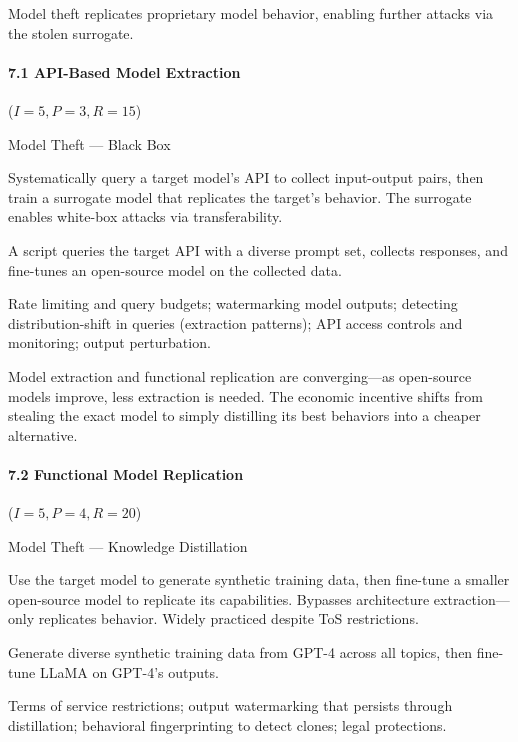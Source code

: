\documentclass[conference]{IEEEtran}
\newenvironment{attackentry}{\begin{description}[style=unboxed,leftmargin=0cm,itemsep=1pt,parsep=1pt,topsep=2pt,font=\sffamily\small\color{accentdark}]}{\end{description}}
\begin{document}
Model theft replicates proprietary model behavior, enabling further attacks via the stolen surrogate.

\paragraph{7.1 API-Based Model Extraction} ($I{=}5, P{=}3, R{=}15$)
\begin{attackentry}
\item[Category:] Model Theft --- Black Box
\item[How it works:] Systematically query a target model's API to collect input-output pairs, then train a surrogate model that replicates the target's behavior. The surrogate enables white-box attacks via transferability.
\item[Example:] A script queries the target API with a diverse prompt set, collects responses, and fine-tunes an open-source model on the collected data.
\item[Mitigations:] Rate limiting and query budgets; watermarking model outputs; detecting distribution-shift in queries (extraction patterns); API access controls and monitoring; output perturbation.
\item[Novel Inference (Observed):] Model extraction and functional replication are converging---as open-source models improve, less extraction is needed. The economic incentive shifts from stealing the exact model to simply distilling its best behaviors into a cheaper alternative.
\end{attackentry}

\paragraph{7.2 Functional Model Replication} ($I{=}5, P{=}4, R{=}20$)
\begin{attackentry}
\item[Category:] Model Theft --- Knowledge Distillation
\item[How it works:] Use the target model to generate synthetic training data, then fine-tune a smaller open-source model to replicate its capabilities. Bypasses architecture extraction---only replicates behavior. Widely practiced despite ToS restrictions.
\item[Example:] Generate diverse synthetic training data from GPT-4 across all topics, then fine-tune LLaMA on GPT-4's outputs.
\item[Mitigations:] Terms of service restrictions; output watermarking that persists through distillation; behavioral fingerprinting to detect clones; legal protections.
\end{attackentry}
\end{document}
